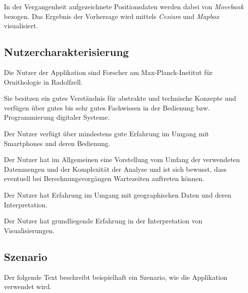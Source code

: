 \documentclass[12pt]{article} %
\begin{document}
In der Vergangenheit aufgezeichnete Positionsdaten werden dabei von \textit{Movebank} bezogen. Das Ergebnis der Vorhersage wird mittels \textit{Cesium} und \textit{Mapbox} visualisiert.


\subsection{Nutzercharakterisierung}

Die Nutzer der Applikation sind Forscher am Max-Planck-Institut für Ornithologie in Radolfzell.

Sie besitzen ein gutes Verständnis für abstrakte und technische Konzepte und verfügen über gutes bis sehr gutes Fachwissen in der Bedienung bzw. Programmierung digitaler Systeme.

Der Nutzer verfügt über mindestens gute Erfahrung im Umgang mit Smartphones und deren Bedienung.

Der Nutzer hat im Allgemeinen eine Vorstellung vom Umfang der verwendeten Datenmengen und der Komplexität der Analyse und ist sich bewusst, dass eventuell bei Berechnungsvorgängen Wartezeiten auftreten können.

Der Nutzer hat Erfahrung im Umgang mit geographischen Daten und deren Interpretation.

Der Nutzer hat grundliegende Erfahrung in der Interpretation von Visualisierungen.


\subsection{Szenario}

Der folgende Text beschreibt beispielhaft ein Szenario, wie die Applikation verwendet wird.
\end{document}
